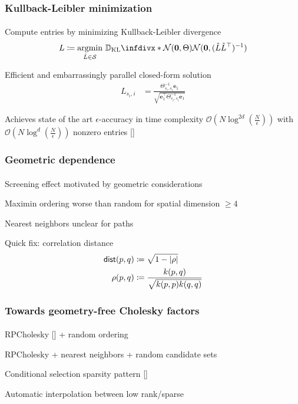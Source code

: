 \documentclass{beamer}                             %
\newcommand*{\defeq}{\coloneqq}
\newcommand*{\BigO}{\mathcal{O}}
\newcommand*{\N}{\mathcal{N}}
\newcommand*{\SpSet}{\mathcal{S}}
\renewcommand*{\vec}[1]{\bm{#1}}
\newcommand*{\CM}{\Theta}
\DeclarePairedDelimiter{\abs}{\lvert}{\rvert}
\DeclareMathOperator*{\argmin}{argmin}
\newcommand*{\KL}{\mathbb{D}_{\operatorname{KL}}\infdivx}
\newenvironment{wideitemize}
  {\itemize\setlength{\itemsep}{0.5cm}}
  {\enditemize}
\begin{document}
\begin{frame}
\frametitle{Kullback-Leibler minimization}
\framesubtitle{}
\begin{wideitemize}
  \item<+-> Compute entries by minimizing Kullback-Leibler divergence
    \begin{align*}
      L \defeq \argmin_{\hat{L} \in \SpSet} \,
        \KL*{\N(\vec{0}, \CM)}
            {\N(\vec{0}, (\hat{L} \hat{L}^{\top})^{-1})}
    \end{align*}
  \item<+-> Efficient and embarrassingly parallel closed-form solution
    \begin{align*}
      L_{s_i, i} &= \frac{\CM_{s_i, s_i}^{-1} \vec{e}_1}
        {\sqrt{\vec{e}_1^{\top} \CM_{s_i, s_i}^{-1} \vec{e}_1}}
    \end{align*}
  \item<+-> Achieves state of the art \( \epsilon \)-accuracy in time
    complexity \( \BigO\left (N \log^{2d}\left (\frac{N}{\epsilon} \right
    ) \right ) \) with \( \BigO\left (N \log^{d}\left (\frac{N}{\epsilon}
    \right ) \right ) \) nonzero entries [\cite{schafer2021sparse}]
\end{wideitemize}
\end{frame}

\begin{frame}
\frametitle{Geometric dependence}
\framesubtitle{}

\begin{wideitemize}
  \item<+-> Screening effect motivated by geometric considerations
  \item<+-> Maximin ordering worse than
    random for spatial dimension \( \geq 4 \)
  \item<2-> Nearest neighbors unclear for paths
  \item<+-> Quick fix: correlation distance
    \begin{align*}
      \mathsf{dist}(p, q) &\defeq \sqrt{1 - \abs{\rho}} \\
      \rho(p, q) &\defeq \frac{k(p, q)}{\sqrt{k(p, p) k(q, q)}}
    \end{align*}
\end{wideitemize}
\end{frame}

\begin{frame}
\frametitle{Towards geometry-free Cholesky factors}
\framesubtitle{}

\begin{wideitemize}
  \item RPCholesky [\cite{chen2023randomly}] + random ordering
  \item RPCholesky + nearest neighbors + random candidate sets
  \item Conditional selection sparsity pattern [\cite{huan2023sparse}]
  \item Automatic interpolation between low rank/sparse
\end{wideitemize}
\end{frame}
\end{document}
